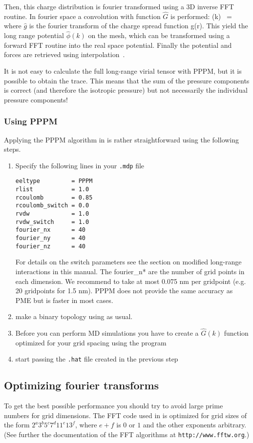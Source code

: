 Then, this charge distribution is fourier transformed using a 3D inverse FFT 
routine.
In fourier space a convolution with function $\hat{G}$ is performed:
\beq
{}(k)      ~=~     
\eeq
where $\hat{g}$ is the fourier transform of the charge spread function
g(r). This yield the long range potential $\hat{\phi}(k)$ on the mesh, which
can be transformed using a forward FFT routine into the real space potential.
Finally the potential and forces are retrieved using interpolation~\cite{Luty95a}.

It is not easy to calculate the full long-range virial tensor with
PPPM, but it is possible to obtain the trace. This means that the sum
of the pressure components is correct (and therefore the isotropic
pressure) but not necessarily the individual pressure components! 

\subsubsection{Using PPPM}
Applying the PPPM algorithm in {\gromacs} is rather straightforward using the
following steps.
\begin{enumerate}
\item   Specify the following lines in your {\tt .mdp} file
\begin{verbatim}
eeltype         = PPPM
rlist           = 1.0
rcoulomb        = 0.85
rcoulomb_switch = 0.0
rvdw            = 1.0
rvdw_switch     = 1.0
fourier_nx      = 40
fourier_ny      = 40
fourier_nz      = 40
\end{verbatim}
For details on the switch parameters see the section on modified
long-range interactions in this manual. The fourier\_n* are the number
of grid points in each 
dimension.
We recommend to take at most 0.075 nm per gridpoint (e.g. 20 gridpoints for 1.5 nm).
PPPM does not provide the same accuracy as PME but is faster in most
cases.

\item   make a binary topology using {\tt{}} as usual. 
\item   Before you can perform MD simulations you have to create a 
        $\hat{G}(k)$ function optimized for your grid spacing using the
        {\tt{}} program
\item   start {\tt{}} passing the {\tt .hat} file created in the
        previous step
\end{enumerate}

\subsection{Optimizing fourier transforms}
To get the best possible performance you should try to avoid large
prime numbers for grid dimensions.
The FFT code used in {\gromacs} is
optimized for grid sizes of the form $2^a 3^b 5^c 7^d 11^e 13^f$,
where $e+f$ is $0$ or $1$ and the other exponents arbitrary. (See
further the documentation of the FFT algorithms at {\tt http://www.fftw.org}.)

